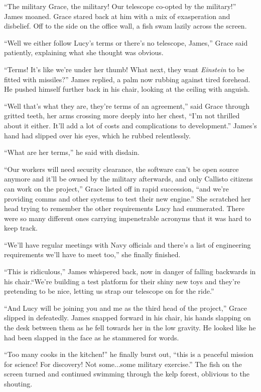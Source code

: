 \documentclass[openany, 12pt]{book} %
\begin{document}
``The military Grace, the military! Our telescope co-opted by the military!'' James moaned. Grace stared back at him with a mix of exasperation and disbelief. Off to the side on the office wall, a fish swam lazily across the screen.

``Well we either follow Lucy's terms or there's no telescope, James,'' Grace said patiently, explaining what she thought was obvious.

``Terms! It's like we're under her thumb! What next, they want \textit{Einstein} to be fitted with missiles?'' James replied, a palm now rubbing against tired forehead. He pushed himself further back in his chair, looking at the ceiling with anguish.

``Well that's what they are, they're terms of an agreement,'' said Grace through gritted teeth, her arms crossing more deeply into her chest, ``I'm not thrilled about it either. It'll add a lot of costs and complications to development.'' James's hand had slipped over his eyes, which he rubbed relentlessly.

``What are her terms,'' he said with disdain.

``Our workers will need security clearance, the software can't be open source anymore and it'll be owned by the military afterwards, and only Callisto citizens can work on the project,'' Grace listed off in rapid succession, ``and we're providing comms and other systems to test their new engine.'' She scratched her head trying to remember the other requirements Lucy had enumerated. There were so many different ones carrying impenetrable acronyms that it was hard to keep track.

``We'll have regular meetings with Navy officials and there's a list of engineering requirements we'll have to meet too,'' she finally finished. 

``This is ridiculous,'' James whispered back, now in danger of falling backwards in his chair.``We're building a test platform for their shiny new toys and they're pretending to be nice, letting us strap our telescope on for the ride.''

``And Lucy will be joining you and me as the third head of the project,'' Grace slipped in defeatedly. James snapped forward in his chair, his hands slapping on the desk between them as he fell towards her in the low gravity. He looked like he had been slapped in the face as he stammered for words.

``Too many cooks in the kitchen!'' he finally burst out, ``this is a peaceful mission for science! For discovery! Not some...some military exercise.'' The fish on the screen turned and continued swimming through the kelp forest, oblivious to the shouting. 
\end{document}
